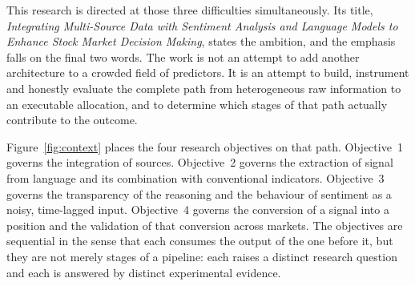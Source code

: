 This research is directed at those three difficulties simultaneously. Its title,
\emph{Integrating Multi-Source Data with Sentiment Analysis and Language Models to
Enhance Stock Market Decision Making}, states the ambition, and the emphasis falls on
the final two words. The work is not an attempt to add another architecture to a crowded
field of predictors. It is an attempt to build, instrument and honestly evaluate the
complete path from heterogeneous raw information to an executable allocation, and to
determine which stages of that path actually contribute to the outcome.

Figure~\ref{fig:context} places the four research objectives on that path. Objective~1
governs the integration of sources. Objective~2 governs the extraction of signal from
language and its combination with conventional indicators. Objective~3 governs the
transparency of the reasoning and the behaviour of sentiment as a noisy, time-lagged
input. Objective~4 governs the conversion of a signal into a position and the validation
of that conversion across markets. The objectives are sequential in the sense that each
consumes the output of the one before it, but they are not merely stages of a pipeline:
each raises a distinct research question and each is answered by distinct experimental
evidence.

